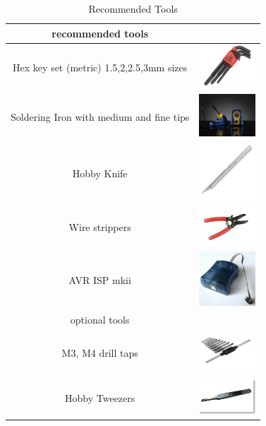 \documentclass[12pt,titlepage,oneside]{memoir}
\begin{document}
\begin{table}[!h]
\begin{tabular}{c | c}
\hline
recommended tools & \\
\hline
Hex key set (metric) 1.5,2,2.5,3mm sizes & \includegraphics[width=80px]{picture/hexkey.jpg}\\
Soldering Iron with medium and fine tips & \includegraphics[width=80px]{picture/solderingiron.jpg}\\
Hobby Knife & \includegraphics[width=80px]{picture/knife.jpg}\\
Wire strippers & \includegraphics[width=80px]{picture/wirestripper.jpg}\\
AVR ISP mkii & \includegraphics[width=80px]{picture/avrisp.jpg}\\
\hline
optional tools & \\
\hline
M3, M4 drill taps  & \includegraphics[width=80px]{picture/taps.jpg}\\
Hobby Tweezers & \includegraphics[width=80px]{picture/tweezer.jpg}
\end{tabular}
\caption{Recommended Tools}
\label{table:tools}
\end{table}
\end{document}
